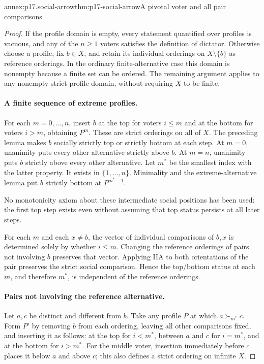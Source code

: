 \begin{annexitem}{annex:p17.social-arrow}{thm:p17-social-arrow}{A pivotal voter and all pair comparisons}
\begin{proof}
If the profile domain is empty, every statement quantified over profiles
is vacuous, and any of the \(n\geq1\) voters satisfies the definition of
dictator. Otherwise choose a profile, fix \(b\in X\), and retain its
individual orderings on \(X\setminus\{b\}\) as reference orderings.
In the ordinary finite-alternative case this domain is nonempty because
a finite set can be ordered. The remaining argument applies to any
nonempty strict-profile domain, without requiring \(X\) to be finite.

\paragraph{A finite sequence of extreme profiles.}
For each \(m=0,\ldots,n\), insert \(b\) at the top for voters
\(i\leq m\) and at the bottom for voters \(i>m\), obtaining \(P^m\).
These are strict orderings on all of \(X\). The preceding lemma makes
\(b\) socially strictly top or strictly bottom at each step.
At \(m=0\), unanimity puts every other alternative strictly above \(b\).
At \(m=n\), unanimity puts \(b\) strictly above every other alternative.
Let \(m^*\) be the smallest index with the latter property. It exists
in \(\{1,\ldots,n\}\). Minimality and the extreme-alternative lemma put
\(b\) strictly bottom at \(P^{m^*-1}\).

No monotonicity axiom about these intermediate social positions has been
used: the first top step exists even without assuming that top status
persists at all later steps.

For each \(m\) and each \(x\ne b\), the vector of individual comparisons
of \(b,x\) is determined solely by whether \(i\leq m\).
Changing the reference orderings of pairs not involving \(b\) preserves
that vector. Applying IIA to both orientations of the pair preserves
the strict social comparison. Hence the top/bottom status at each \(m\),
and therefore \(m^*\), is independent of the reference orderings.

\paragraph{Pairs not involving the reference alternative.}
Let \(a,c\) be distinct and different from \(b\). Take any profile \(P\)
at which \(a\succ_{m^*}c\). Form \(P'\) by removing \(b\) from each
ordering, leaving all other comparisons fixed, and inserting it as follows:
at the top for \(i<m^*\), between \(a\) and \(c\) for \(i=m^*\),
and at the bottom for \(i>m^*\).
For the middle voter, insertion immediately before \(c\) places it below
\(a\) and above \(c\); this also defines a strict ordering on infinite \(X\).


\end{proof}
\end{annexitem}
